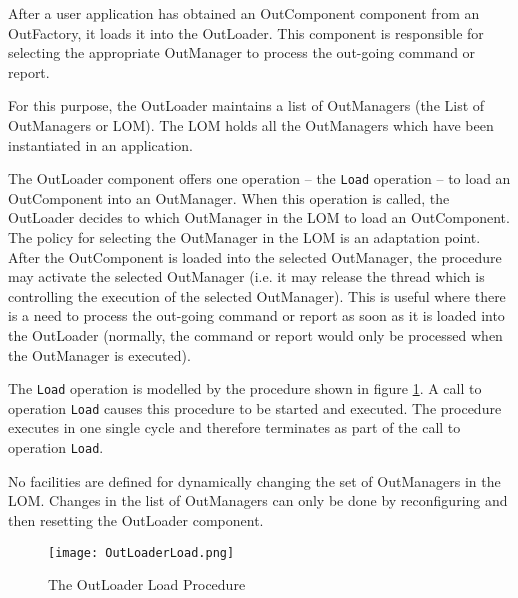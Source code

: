 After a user application has obtained an OutComponent component from an OutFactory, it loads it into the OutLoader. This component is responsible for selecting the appropriate OutManager to process the out-going command or report.

For this purpose, the OutLoader maintains a list of OutManagers (the List of OutManagers or LOM). The LOM holds all the OutManagers which have been instantiated in an application. 

The OutLoader component offers one operation – the \texttt{Load} operation – to load an OutComponent into an OutManager. When this operation is called, the OutLoader decides to which OutManager in the LOM to load an OutComponent. The policy for selecting the OutManager in the LOM is an adaptation point. After the OutComponent is loaded into the selected OutManager, the procedure may activate the selected OutManager (i.e. it may release the thread which is controlling the execution of the selected OutManager). This is useful where there is a need to process the out-going command or report as soon as it is loaded into the OutLoader (normally, the command or report would only be processed when the OutManager is executed). 
 
The \texttt{Load} operation is modelled by the procedure shown in figure \ref{fig:OutLoaderLoad}. A call to operation \texttt{Load} causes this procedure to be started and executed. The procedure executes in one single cycle and therefore terminates as part of the call to operation \texttt{Load}. 

No facilities are defined for dynamically changing the set of OutManagers in the LOM. Changes in the list of OutManagers can only be done by reconfiguring and then resetting the OutLoader component.

\begin{figure}[h]
 \centering
 \texttt{[image: OutLoaderLoad.png]}
 \caption{The OutLoader Load Procedure}
 \label{fig:OutLoaderLoad}
\end{figure}
